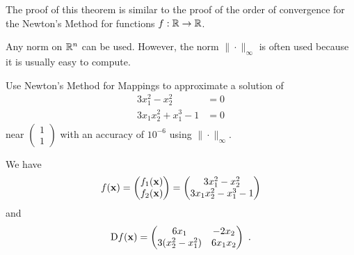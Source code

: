 The proof of this theorem is similar to the proof of the order of
convergence for the Newton's Method for functions $f:\mathbb{R} \to \mathbb{R}$.

\begin{rmk}
Any norm on $\mathbb{R}^n$ can be used.  However, the norm $\|\cdot\|_\infty$
is often used because it is usually easy to compute.
\end{rmk}

\begin{egg}
Use Newton's Method for Mappings to approximate a solution of
\begin{align*}
3x_1^2 - x_2^2 &= 0\\
3x_1x_2^2 + x_1^3 - 1 &= 0
\end{align*}
near $\begin{pmatrix} 1 \\ 1 \end{pmatrix}$
with an accuracy of $10^{-6}$ using $\|\cdot\|_\infty$.

We have
\[
f(\mathbf{x}) = \begin{pmatrix}
f_1(\mathbf{x}) \\ f_2(\mathbf{x})
\end{pmatrix} = \begin{pmatrix}
3x_1^2 - x_2^2 \\
3x_1x_2^2 - x_1^3 -1
\end{pmatrix}
\]
and
\[
\mathrm{D} f(\mathbf{x}) = \begin{pmatrix}
6x_1 &  -2 x_2 \\
3(x_2^2 - x_1^2) & 6x_1x_2
\end{pmatrix} \ .
\]


\end{egg}
